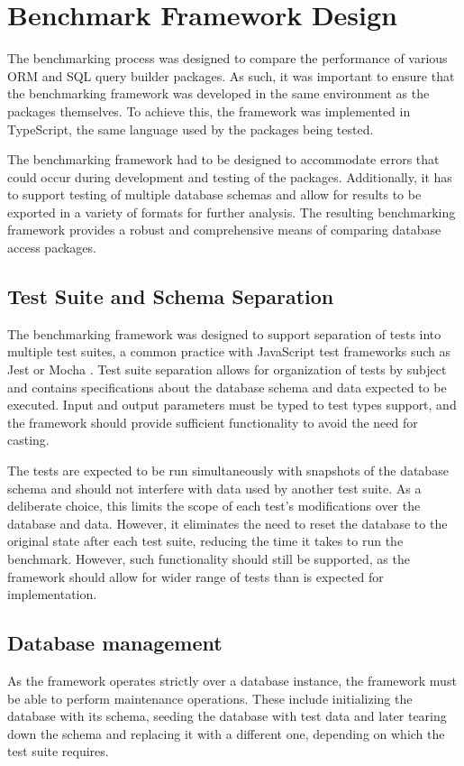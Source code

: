 \chapter{Benchmark Framework Design}

The benchmarking process was designed to compare the performance of various ORM
and SQL query builder packages. As such, it was important to ensure that the
benchmarking framework was developed in the same environment as the packages
themselves. To achieve this, the framework was implemented in TypeScript, the
same language used by the packages being tested.

The benchmarking framework had to be designed to accommodate errors that could
occur during development and testing of the packages. Additionally, it has to
support testing of multiple database schemas and allow for results to be
exported in a variety of formats for further analysis. The resulting
benchmarking framework provides a robust and comprehensive means of comparing
database access packages.

\section{Test Suite and Schema Separation}

The benchmarking framework was designed to support separation of tests into
multiple test suites, a common practice with JavaScript test frameworks such as
Jest \cite{Jest} or Mocha \cite{Mocha}. Test suite separation allows for
organization of tests by subject and contains specifications about the database
schema and data expected to be executed. Input and output parameters must be
typed to test types support, and the framework should provide sufficient
functionality to avoid the need for casting.

The tests are expected to be run simultaneously with snapshots of the database
schema and should not interfere with data used by another test suite. As a
deliberate choice, this limits the scope of each test's modifications over the
database and data. However, it eliminates the need to reset the database to the
original state after each test suite, reducing the time it takes to run the
benchmark. However, such functionality should still be supported, as the
framework should allow for wider range of tests than is expected for
implementation.

\section{Database management}
As the framework operates strictly over a database instance, the framework must
be able to perform maintenance operations. These include initializing the
database with its schema, seeding the database with test data and later tearing
down the schema and replacing it with a different one, depending on which the
test suite requires.

